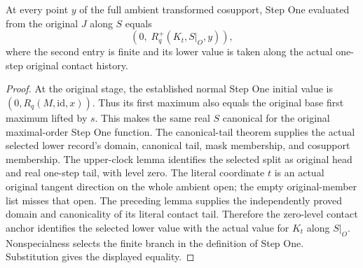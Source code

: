 \begin{theorem}
\label{hir:disjoint-first-step-step-one-anchor}
\leanok
At every point $y$ of the full ambient transformed cosupport, Step One
evaluated from the original $J$ along $S$ equals
\[
 \left(0,\;R_q^+(K_t,S|_O,y)\right),
\]
where the second entry is finite and its lower value is taken along the
actual one-step original contact history.
\end{theorem}
\begin{proof}
At the original stage, the established normal Step One initial value is
$(0,R_q(M,\mathrm{id},x))$. Thus its first maximum also equals the original
base first maximum lifted by $s$. This makes the same real $S$ canonical
for the original maximal-order Step One function. The canonical-tail
theorem supplies the actual selected lower record's domain, canonical tail,
mask membership, and cosupport membership. The upper-clock lemma identifies
the selected split as original head and real one-step tail, with level zero.
The literal coordinate $t$ is an actual original tangent direction on the
whole ambient open; the empty original-member list misses that open. The
preceding lemma supplies the independently proved domain and canonicality
of its literal contact tail. Therefore the zero-level contact anchor
identifies the selected lower value with the actual value for $K_t$ along
$S|_O$. Nonspecialness selects the finite branch in the definition of Step
One. Substitution gives the displayed equality.
\end{proof}

